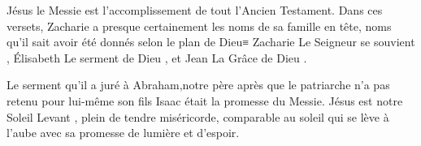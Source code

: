 Jésus le Messie est l'accomplissement de tout l'Ancien Testament. Dans ces versets, Zacharie a presque certainement les noms de sa famille en tête, noms qu'il sait avoir été donnés selon le plan de Dieu≡ Zacharie \ocadr \og Le Seigneur se souvient \fg{}, Élisabeth \ocadr \og Le serment de Dieu \fg{}, et Jean \ocadr \og La Grâce de Dieu \fg{}.

\og Le serment qu’il a juré à Abraham,notre père \fg{} après que le patriarche n'a pas retenu pour lui-même son fils Isaac était la promesse du Messie. Jésus est notre \og Soleil Levant \fg{}, plein de tendre miséricorde, comparable au soleil qui se lève à l'aube avec sa promesse de lumière et d'espoir.

\enlargethispage{5\baselineskip}

